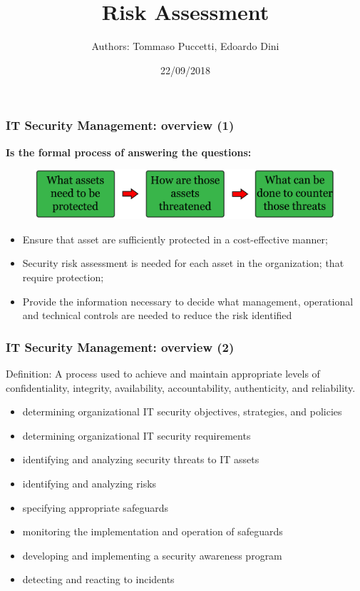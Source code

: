 \documentclass[xcolor ={table,usenames,dvipsnames}]{beamer}
\title{Risk Assessment}
\author{Authors: Tommaso Puccetti, Edoardo Dini}
\institute{Universit\`a  degli studi di Firenze}
\date{22/09/2018}
\theoremstyle{definition}
\begin{document}
	
	\begin{frame}
		\maketitle
	\end{frame}
	
	\begin{frame}
		\frametitle{IT Security Management: overview (1)}
	\textbf{	Is the formal process of answering the questions:}
		\begin{figure}[h!]
			\centering
			\includegraphics[scale=0.20]{img/img_01.PNG}
			\label{Interfacce di un CS}
		\end{figure}
		\begin{itemize}
			\item Ensure that asset are sufficiently protected in a cost-effective manner;
			\item Security risk assessment is needed for each asset in the organization;  that require protection;
			\item Provide the information necessary to decide what management, operational and technical controls are needed to reduce the risk identified
		\end{itemize}
	\end{frame}

	\begin{frame}
		\frametitle{IT Security Management: overview (2)}
		\begin{alertblock}{Definition:}
			 A process used to achieve and maintain appropriate levels of confidentiality, integrity, availability, accountability, authenticity, and reliability. 
		\end{alertblock}
		\begin{itemize}
			\item determining organizational IT security objectives, strategies, and policies
			\item determining organizational IT security requirements
			\item identifying and analyzing security threats to IT assets 
			\item identifying and analyzing risks
			\item specifying appropriate safeguards
			\item monitoring the implementation and operation of safeguards
			\item developing and implementing a security awareness program
			\item detecting and reacting to incidents
		\end{itemize}	
	\end{frame}
\end{document}
